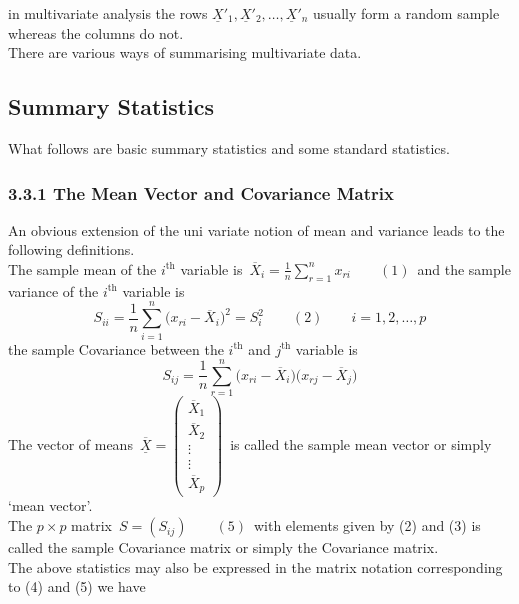 \documentclass[11pt,a4paper]{article}
\theoremstyle{definition}
\begin{document}
in multivariate analysis the rows $\underline{X}'_1,\underline{X}'_2,\ldots,\underline{X}'_n$ usually form a random sample whereas the columns do not.\\

There are various ways of summarising multivariate data.\\





\subsection{Summary Statistics}
What follows are basic summary statistics and some standard statistics.\\

\subsubsection*{3.3.1 The Mean Vector and Covariance Matrix}
An obvious extension of the uni variate  notion of mean and variance leads to the following definitions.\\
The sample mean of the $i^{\text{th}}$ variable is \,$\displaystyle{\overline{X}_i=\frac{1}{n}\sum^n_{r=1}x_{ri}\qquad (1)}\,$ and the sample variance of the $i^{\text{th}}$ variable is $$S_{ii}=\frac{1}{n}\sum^n_{i=1}\big(x_{ri}-\overline{X}_{i}\big)^2=S^2_i\qquad (2)\qquad i= 1,2,\ldots, p$$ the sample Covariance between the $i^{\text{th}}$ and $j^{\text{th}}$ variable is 
 \begin{equation}\tag{3}
S_{ij} = \frac{1}{n}\sum^n_{r=1}\big(x_{ri}-\overline{X}_i\big)\big(x_{rj}-\overline{X}_j\big)
\end{equation}
The vector of means \,$\displaystyle{\overline{\underline{X}}=
\begin{pmatrix}
\overline{X}_1\\
\overline{X}_2\\
\vdots\\
\vdots\\
\overline{X}_p
\end{pmatrix}
}\,$
is called the sample mean vector or simply `mean vector'.\\

The $p\times p$ matrix \,$S=(S_{ij})\qquad (5)\,$
with elements given by (2) and (3) is called the sample Covariance matrix or simply the Covariance matrix.\\

The above statistics may also be expressed in the matrix notation corresponding to (4) and (5) we have
\end{document}
